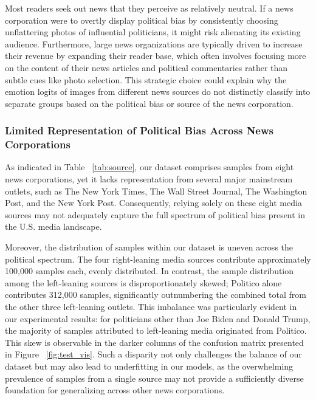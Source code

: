\documentclass[sigconf]{acmart}
\begin{document}
Most readers seek out news that they perceive as relatively neutral. If a news corporation were to overtly display political bias by consistently choosing unflattering photos of influential politicians, it might risk alienating its existing audience. Furthermore, large news organizations are typically driven to increase their revenue by expanding their reader base, which often involves focusing more on the content of their news articles and political commentaries rather than subtle cues like photo selection. This strategic choice could explain why the emotion logits of images from different news sources do not distinctly classify into separate groups based on the political bias or source of the news corporation.


\subsubsection{Limited Representation of Political Bias Across News Corporations}

As indicated in Table ~\ref{tab:source}, our dataset comprises samples from eight news corporations, yet it lacks representation from several major mainstream outlets, such as The New York Times, The Wall Street Journal, The Washington Post, and the New York Post. Consequently, relying solely on these eight media sources may not adequately capture the full spectrum of political bias present in the U.S. media landscape.

Moreover, the distribution of samples within our dataset is uneven across the political spectrum. The four right-leaning media sources contribute approximately 100,000 samples each, evenly distributed. In contrast, the sample distribution among the left-leaning sources is disproportionately skewed; Politico alone contributes 312,000 samples, significantly outnumbering the combined total from the other three left-leaning outlets. This imbalance was particularly evident in our experimental results: for politicians other than Joe Biden and Donald Trump, the majority of samples attributed to left-leaning media originated from Politico. This skew is observable in the darker columns of the confusion matrix presented in Figure ~\ref{fig:test_vis}. Such a disparity not only challenges the balance of our dataset but may also lead to underfitting in our models, as the overwhelming prevalence of samples from a single source may not provide a sufficiently diverse foundation for generalizing across other news corporations.
\end{document}
